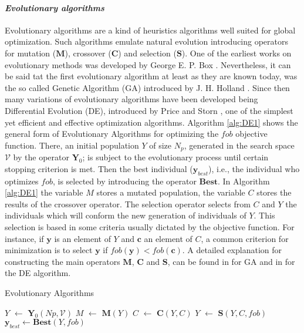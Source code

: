 \paragraph{\it Evolutionary algorithms}
Evolutionary algorithms are a kind of heuristics algorithms well 
suited for global optimization. Such algorithms emulate natural
evolution introducing operators for mutation ($\mathbf{M}$), crossover 
($\mathbf{C}$) and selection ($\mathbf{S}$). One of the earliest works
on evolutionary methods was developed by George E. P. Box \cite{Box1957}.
Nevertheless, it can be said tat the first evolutionary algorithm at
least as they are known today, was the so called Genetic Algorithm (GA) 
introduced by J. H. Holland \cite{JHH1975}. Since then many variations of
evolutionary algorithms have been developed being Differential Evolution (DE),
introduced by Price and Storn \cite{Storn1997}, one of the simplest yet efficient and 
effective optimization algorithms. Algorithm \ref{alg:DE1} shows the 
general form of Evolutionary Algorithms for optimizing the $fob$ 
objective function. There, an initial population $Y$ of size $N_p$, 
generated in the search space $\mathcal{V}$ by the operator $\mathbf{Y}_0$;
is subject to the evolutionary process until certain stopping criterion is 
met. Then the best individual ($\mathbf{y}_{best}$), i.e., the individual who
optimizes $fob$, is selected by introducing the operator $\mathbf{Best}$. 
In Algorithm \ref{alg:DE1} the variable $M$ stores a mutated population, 
the variable $C$ stores the results of the crossover operator. The selection
operator selects from $C$ and $Y$ the individuals which will conform the new
generation of individuals of $Y$. This selection is based in some criteria usually dictated by the
objective function. For instance, if $\mathbf{y}$ is an element of $Y$
and $\mathbf{c}$ an element of $C$, a common criterion for minimization is 
to select $\mathbf{y}$ if $fob(\mathbf{y})<fob(\mathbf{c})$.
A detailed explanation for constructing the main operators 
$\mathbf{M}$, $\mathbf{C}$ and $\mathbf{S}$, can be found in
\cite{Bagchi1999} for GA and in \cite{Price_Storn2005} for the DE
algorithm.
%
\begin{algorithm}[H]
\caption{Evolutionary Algorithms}
\label{alg:DE1}
\begin{algorithmic}
\State $Y$ $\leftarrow$ $\mathbf{Y}_0(Np,\mathcal{V})$
\State $M$ $\leftarrow$  $\mathbf{M}(Y)$
\State $C$ $\leftarrow$  $\mathbf{C}(Y,C)$
\State $Y$ $\leftarrow$  $\mathbf{S}(Y,C,fob)$ 
\EndWhile
\State $\mathbf{y}_{best} \leftarrow \mathbf{Best}(Y, fob)$
\end{algorithmic}
\end{algorithm}%


